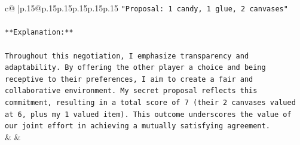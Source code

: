 \documentclass{article}
\begin{document}
{\begin{supertabular}{c@{$\;$}|p{.15\linewidth}@{}p{.15\linewidth}p{.15\linewidth}p{.15\linewidth}p{.15\linewidth}p{.15\linewidth}}
{{{\texttt{"Proposal: 1 candy, 1 glue, 2 canvases"} \\
\\ 
\texttt{**Explanation:**} \\
\\ 
\texttt{Throughout this negotiation, I emphasize transparency and adaptability. By offering the other player a choice and being receptive to their preferences, I aim to create a fair and collaborative environment. My secret proposal reflects this commitment, resulting in a total score of 7 (their 2 canvases valued at 6, plus my 1 valued item). This outcome underscores the value of our joint effort in achieving a mutually satisfying agreement.} \\
            }
        }
    }
    & & \\ \\


\end{supertabular}}
\end{document}
